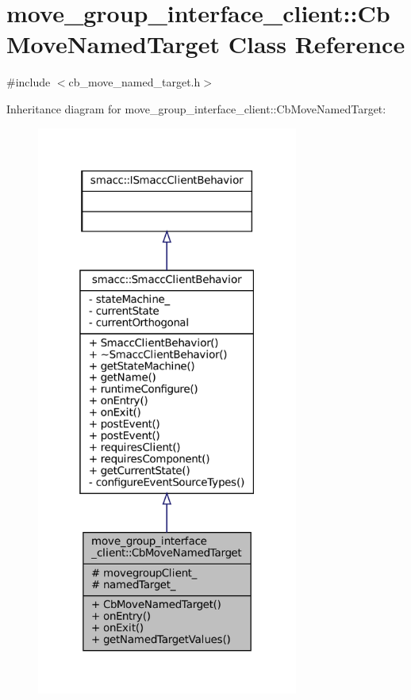 \hypertarget{classmove__group__interface__client_1_1CbMoveNamedTarget}{}\section{move\+\_\+group\+\_\+interface\+\_\+client\+:\+:Cb\+Move\+Named\+Target Class Reference}
\label{classmove__group__interface__client_1_1CbMoveNamedTarget}


{\ttfamily \#include $<$cb\+\_\+move\+\_\+named\+\_\+target.\+h$>$}



Inheritance diagram for move\+\_\+group\+\_\+interface\+\_\+client\+:\+:Cb\+Move\+Named\+Target\+:
\nopagebreak
\begin{figure}[H]
\begin{center}
\leavevmode
\includegraphics[width=244pt]{classmove__group__interface__client_1_1CbMoveNamedTarget__inherit__graph}
\end{center}
\end{figure}


